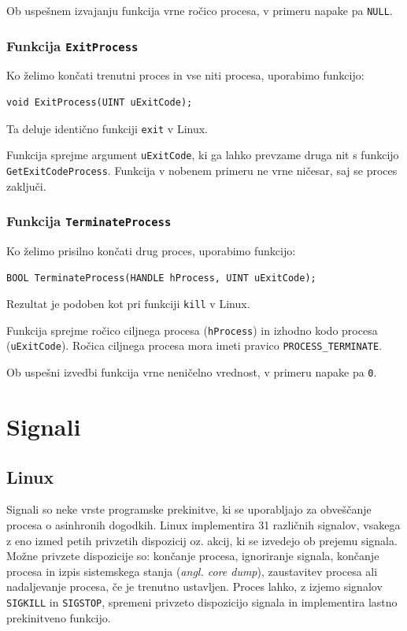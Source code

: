 \documentclass[a4paper,12pt,openright]{book}
\begin{document}
Ob uspešnem izvajanju funkcija vrne ročico procesa, v primeru napake pa \texttt{NULL}.

\subsubsection{Funkcija \texttt{ExitProcess}}

Ko želimo končati trenutni proces in vse niti procesa, uporabimo funkcijo:
\begin{lstlisting}[style=func]
 void ExitProcess(UINT uExitCode);
\end{lstlisting}
Ta deluje identično funkciji \texttt{exit} v Linux.

Funkcija sprejme argument \texttt{uExitCode}, ki ga lahko prevzame druga nit s funkcijo \texttt{GetExitCodeProcess}.
Funkcija v nobenem primeru ne vrne ničesar, saj se proces zaključi.

\subsubsection{Funkcija \texttt{TerminateProcess}}

Ko želimo prisilno končati drug proces, uporabimo funkcijo:
\begin{lstlisting}[style=func]
 BOOL TerminateProcess(HANDLE hProcess, UINT uExitCode);
\end{lstlisting}
Rezultat je podoben kot pri funkciji \texttt{kill} v Linux.

Funkcija sprejme ročico ciljnega procesa (\texttt{hProcess}) in izhodno kodo procesa (\texttt{uExitCode}).
Ročica ciljnega procesa mora imeti pravico \texttt{PROCESS\-\_TERMINATE}.

Ob uspešni izvedbi funkcija vrne neničelno vrednost, v primeru napake pa \texttt{0}.

\section{Signali}

\subsection{Linux}

Signali so neke vrste programske prekinitve, ki se uporabljajo za obveščanje procesa o asinhronih dogodkih. %
Linux implementira 31 različnih signalov, vsakega z eno izmed petih privzetih dispozicij oz. akcij, ki se izvedejo ob prejemu signala.
Možne privzete dispozicije so: končanje procesa, ignoriranje signala, končanje procesa in izpis sistemskega stanja (\textit{angl. core dump}), zaustavitev procesa ali nadaljevanje procesa, če je trenutno ustavljen.
Proces lahko, z izjemo signalov \texttt{SIGKILL} in \texttt{SIGSTOP}, spremeni privzeto dispozicijo signala in implementira lastno prekinitveno funkcijo.
\end{document}
